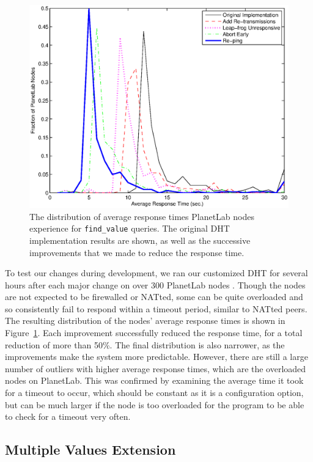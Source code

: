 \documentclass[conference]{IEEEtran}
\begin{document}
\begin{figure}
\centering
\includegraphics[width=0.80\columnwidth]{apt_p2p_improvements-find_value.eps}
\caption{The distribution of average response times PlanetLab nodes
experience for \texttt{find\_value} queries. The original DHT
implementation results are shown, as well as the successive
improvements that we made to reduce the response time.}
\label{improvements}
\end{figure}

To test our changes during development, we ran our customized DHT
for several hours after each major change on over 300 PlanetLab nodes
\cite{planetlab}. Though the nodes are not expected to be firewalled
or NATted, some can be quite overloaded and so consistently fail to
respond within a timeout period, similar to NATted peers. The
resulting distribution of the nodes' average response times is shown
in Figure~\ref{improvements}. Each improvement successfully reduced
the response time, for a total reduction of more than 50\%. The
final distribution is also narrower, as the improvements make the
system more predictable. However, there are still a large number of
outliers with higher average response times, which are the
overloaded nodes on PlanetLab. This was confirmed by examining the
average time it took for a timeout to occur, which should be
constant as it is a configuration option, but can be much larger if
the node is too overloaded for the program to be able to check for a
timeout very often.

\subsection{Multiple Values Extension}
\label{multiple_values}
\end{document}
